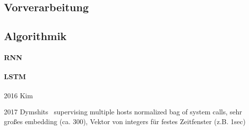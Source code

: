         \subsection{Vorverarbeitung}

        \subsection{Algorithmik}

        \paragraph{RNN}

        \paragraph{LSTM}

        2016 Kim~\cite{LSTMsys} 

        2017 Dymshits~\cite{LSTMDYMSHITS2017} supervising multiple hosts
        normalized bag of system calls, sehr großes embedding (ca. 300), Vektor von integers für festes Zeitfenster (z.B. 1sec)



